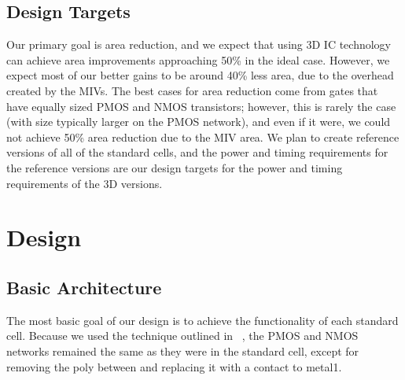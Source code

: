 \documentclass{article}
\begin{document}
\subsection{Design Targets} Our primary goal is area reduction, and we expect that using 3D IC technology can achieve area improvements approaching 50\% in the ideal case. However, we expect most of our better gains to be around 40\% less area, due to the overhead created by the MIVs. The best cases for area reduction come from gates that have equally sized PMOS and NMOS transistors; however, this is rarely the case (with size typically larger on the PMOS network), and even if it were, we could not achieve 50\% area reduction due to the MIV area. We plan to create reference versions of all of the standard cells, and the power and timing requirements for the reference versions are our design targets for the power and timing requirements of the 3D versions. 

\section{Design}
\subsection{Basic Architecture} The most basic goal of our design is to achieve the functionality of each standard cell. Because we used the technique outlined in ~\cite{ULTRA}, the PMOS and NMOS networks remained the same as they were in the standard cell, except for removing the poly between and replacing it with a contact to metal1. 
\end{document}
